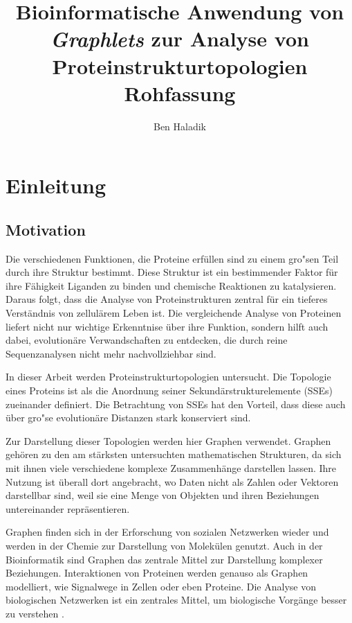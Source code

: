 \documentclass{report}
\author{Ben Haladik}
\title{Bioinformatische Anwendung von \textit{Graphlets} zur Analyse von Proteinstrukturtopologien \\ Rohfassung}
\begin{document}


\maketitle

\newpage

\tableofcontents

\newpage

\chapter{Einleitung}

\section{Motivation}


Die verschiedenen Funktionen, die Proteine erf\"ullen sind zu einem gro"sen Teil durch ihre Struktur bestimmt. Diese Struktur ist ein bestimmender Faktor f\"ur ihre F\"ahigkeit Liganden zu binden und chemische Reaktionen zu katalysieren.
Daraus folgt, dass die Analyse von Proteinstrukturen zentral f\"ur ein tieferes Verst\"andnis von zellul\"arem Leben ist. Die vergleichende Analyse von Proteinen liefert nicht nur wichtige Erkenntnise \"uber ihre Funktion, sondern hilft auch dabei, evolution\"are Verwandschaften zu entdecken, die durch reine Sequenzanalysen nicht mehr nachvollziehbar sind.

In dieser Arbeit werden Proteinstrukturtopologien untersucht. Die Topologie eines Proteins ist als die Anordnung seiner Sekund\"arstrukturelemente (SSEs) zueinander definiert. Die Betrachtung von SSEs hat den Vorteil, dass diese auch \"uber gro"se evolution\"are Distanzen stark konserviert sind. 

Zur Darstellung dieser Topologien werden hier Graphen verwendet. Graphen geh\"oren zu den am st\"arksten untersuchten mathematischen Strukturen, da sich mit ihnen viele verschiedene komplexe Zusammenh\"ange darstellen lassen. Ihre Nutzung ist \"uberall dort angebracht, wo Daten nicht als Zahlen oder Vektoren darstellbar sind, weil sie eine Menge von Objekten und ihren Beziehungen untereinander repr\"asentieren.


Graphen finden sich in der Erforschung von sozialen Netzwerken wieder und werden in der Chemie zur Darstellung von Molek\"ulen genutzt. Auch in der Bioinformatik sind Graphen das zentrale Mittel zur Darstellung komplexer Beziehungen. Interaktionen von Proteinen werden genauso als Graphen modelliert, wie Signalwege in Zellen oder eben Proteine. Die Analyse von biologischen Netzwerken ist ein zentrales Mittel, um biologische Vorg\"ange besser zu verstehen \cite{junker2011analysis}.
\end{document}
